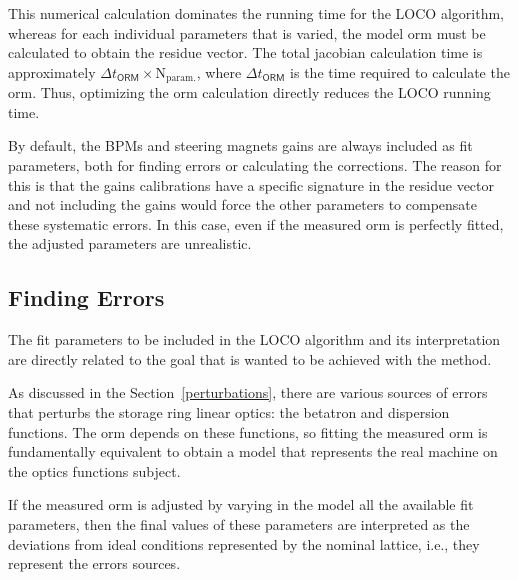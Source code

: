 This numerical calculation dominates the running time for the LOCO algorithm, whereas for each individual parameters that is varied, the model \gls{orm} must be calculated to obtain the residue vector. The total jacobian calculation time is approximately $\Delta t_{\mathsf{ORM}} \times \mathrm{N}_{\mathrm{param.}}$, where $\Delta t_{\mathsf{ORM}}$ is the time required to calculate the \gls{orm}. Thus, optimizing the \gls{orm} calculation directly reduces the LOCO running time. 

By default, the BPMs and steering magnets gains are always included as fit parameters, both for finding errors or calculating the corrections. The reason for this is that the gains calibrations have a specific signature in the residue vector and not including the gains would force the other parameters to compensate these systematic errors. In this case, even if the measured \gls{orm} is perfectly fitted, the adjusted parameters are unrealistic. 
\subsection{Finding Errors}
The fit parameters to be included in the LOCO algorithm and its interpretation are directly related to the goal that is wanted to be achieved with the method. 

As discussed in the Section~\ref{perturbations}, there are various sources of errors that perturbs the storage ring linear optics: the betatron and dispersion functions. The \gls{orm} depends on these functions, so fitting the measured \gls{orm} is fundamentally equivalent to obtain a model that represents the real machine on the optics functions subject.

If the measured \gls{orm} is adjusted by varying in the model all the available fit parameters, then the final values of these parameters are interpreted as the deviations from ideal conditions represented by the nominal lattice, i.e., they represent the errors sources. 

